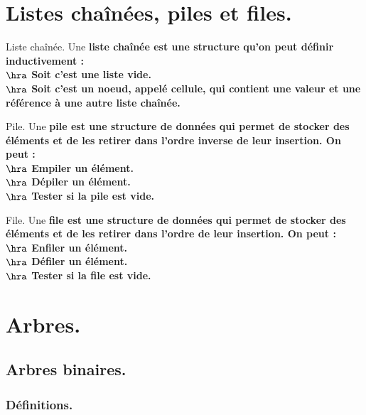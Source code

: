 \documentclass[french, 11pt]{article}
\begin{document}


\section{Listes chaînées, piles et files.}

\begin{defi}{Liste chaînée.}{}
    Une \bf{liste chaînée} est une structure qu'on peut définir inductivement :\\
    $\hra$ Soit c'est une liste vide.\\
    $\hra$ Soit c'est un noeud, appelé \bf{cellule}, qui contient une valeur et une référence à une autre liste chaînée.
\end{defi}

\vspace*{-0.7cm}

\begin{defi}{Pile.}{}
    Une \bf{pile} est une structure de données qui permet de stocker des éléments et de les retirer dans l'ordre inverse de leur insertion. On peut :\\
    $\hra$ \bf{Empiler} un élément.\\
    $\hra$ \bf{Dépiler} un élément.\\
    $\hra$ \bf{Tester} si la pile est vide.
\end{defi}

\vspace*{-0.7cm}

\begin{defi}{File.}{}
    Une \bf{file} est une structure de données qui permet de stocker des éléments et de les retirer dans l'ordre de leur insertion. On peut :\\
    $\hra$ \bf{Enfiler} un élément.\\
    $\hra$ \bf{Défiler} un élément.\\
    $\hra$ \bf{Tester} si la file est vide.
\end{defi}

\section{Arbres.}
\subsection{Arbres binaires.}
\subsubsection{Définitions.}
\end{document}
